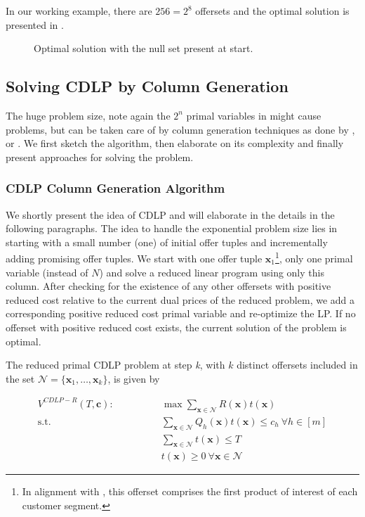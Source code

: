 In our working example, there are $256 = 2^8$ offersets and the optimal solution is presented in .

\begin{figure}[!ht]
	
	\caption{Optimal solution with the null set present at start.\label{txt-CDLP-Stefan}}
\end{figure}


\subsection{Solving CDLP by Column Generation}\label{ss:cdlp2}

The huge problem size, note again the $2^n$ primal variables in  might cause problems, but can be taken care of by column generation techniques as done by \eg \cite{GGallego.}, \cite{Liu.2008} or \cite{Bront.2009}. We first sketch the algorithm, then elaborate on its complexity and finally present approaches for solving the problem.

\subsubsection{CDLP Column Generation Algorithm}

We shortly present the idea of CDLP and will elaborate in the details in the following paragraphs. The idea to handle the exponential problem size lies in starting with a small number (\eg one) of initial offer tuples and incrementally adding promising offer tuples. We start with one offer tuple $\boldsymbol{x}_1$\footnote{In alignment with \cite{Bront.2009}, this offerset comprises the first product of interest of each customer segment.}, \ie only one primal variable (instead of $N$) and solve a reduced linear program using only this column. After checking for the existence of any other offersets with positive reduced cost relative to the current dual prices of the reduced problem, we add a corresponding positive reduced cost primal variable and re-optimize the LP. If no offerset with positive reduced cost exists, the current solution of the problem is optimal.

The reduced primal CDLP problem at step \emph{k}, \ie with $k$ distinct offersets included in the set $\mathcal{N}=\{\boldsymbol{x}_1, \dots, \boldsymbol{x}_k\}$, is given by

\begin{align}
V^{CDLP-R}(T, \boldsymbol{c}): \qquad\qquad & \max \sum_{\boldsymbol{x}\in \mathcal{N}} R(\boldsymbol{x}) t(\boldsymbol{x})\label{eq:CDLPr}\\
\text{s.t. } & \sum_{\boldsymbol{x}\in \mathcal{N}} Q_h(\boldsymbol{x}) t(\boldsymbol{x}) \leq c_h ~\forall h \in [m]\\
& \sum_{\boldsymbol{x}\in \mathcal{N}} t(\boldsymbol{x}) \leq T\\
& t(\boldsymbol{x}) \geq 0 ~\forall \boldsymbol{x} \in \mathcal{N}
\end{align}

